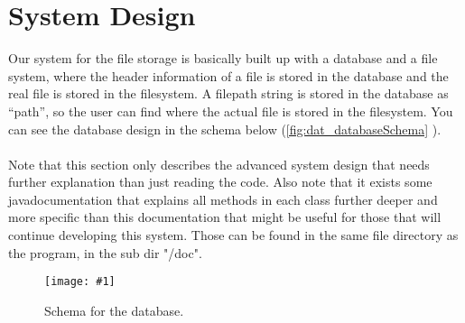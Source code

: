\documentclass[a4paper]{report}
\newcommand{\addImage}[1]{\centering\texttt{[image: \#1]}}
\newcommand{\refer}[1]{\autoref{#1}}
\begin{document}
\section{System Design}

Our system for the file storage is basically built up with a database and a file system, where the header information of a file is stored in the database and the real file is stored in the filesystem. A filepath string is stored in the database as “path”, so the user can find where the actual file is stored in the filesystem. You can see the database design in the schema below (\refer{fig:dat_databaseSchema} ). \\
\\
Note that this section only describes the advanced system design that needs further explanation than just reading the code. Also note that it exists some javadocumentation that explains all methods in each class further deeper and more specific than this documentation that might be useful for those that will continue developing this system. Those can be found in the same file directory as the program, in the sub dir "/doc".

\begin{figure}[htb]
\addImage{dat_schema_V3.jpg}
\caption{Schema for the database.}
\label{fig:dat_databaseSchema}
\end{figure}
\end{document}

